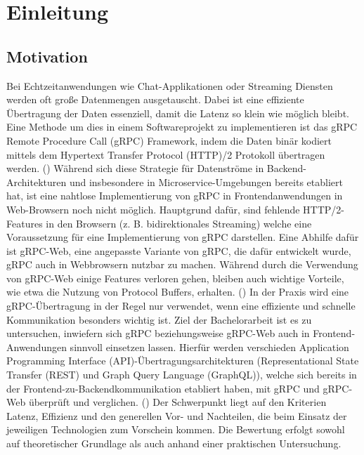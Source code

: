 \chapter{ Einleitung }
\label{chap:info_REMOVE_ME}
\chapterstart

\section{Motivation}
Bei Echtzeitanwendungen wie Chat-Applikationen oder Streaming Diensten werden oft große Datenmengen ausgetauscht. Dabei ist eine effiziente Übertragung der Daten essenziell, damit die Latenz so klein wie möglich bleibt. Eine Methode um dies in einem Softwareprojekt zu implementieren ist das gRPC Remote Procedure Call (gRPC) Framework, indem die Daten binär kodiert mittels dem Hypertext Transfer Protocol (HTTP)/2 Protokoll übertragen werden. (\parencite{gRPCAbout})
Während sich diese Strategie für Datenströme in Backend-Architekturen und insbesondere in Microservice-Umgebungen bereits etabliert hat, ist eine nahtlose Implementierung von gRPC in Frontendanwendungen in Web-Browsern noch nicht möglich. Hauptgrund dafür, sind fehlende HTTP/2-Features in den Browsern (z. B. bidirektionales Streaming) welche eine Voraussetzung für eine Implementierung von gRPC darstellen. Eine Abhilfe dafür ist gRPC-Web, eine angepasste Variante von gRPC, die dafür entwickelt wurde, gRPC auch in Webbrowsern nutzbar zu machen. Während durch die Verwendung von gRPC-Web einige Features verloren gehen, bleiben auch wichtige Vorteile, wie etwa die Nutzung von Protocol Buffers, erhalten. (\parencite{Brandhorst2019}) In der Praxis wird eine gRPC-Übertragung in der Regel nur verwendet, wenn eine effiziente und schnelle Kommunikation besonders wichtig ist. Ziel der Bachelorarbeit ist es zu untersuchen, inwiefern sich gRPC beziehungsweise gRPC-Web auch in Frontend-Anwendungen sinnvoll einsetzen lassen. Hierfür werden verschieden Application Programming Interface (API)-Übertragungsarchitekturen (Representational State Transfer (REST) und Graph Query Language (GraphQL)), welche sich bereits in der Frontend-zu-Backendkommunikation etabliert haben, mit gRPC und gRPC-Web überprüft und verglichen. (\parencite{redhat-apiguide}) Der Schwerpunkt liegt auf den Kriterien Latenz, Effizienz und den generellen Vor- und Nachteilen, die beim Einsatz der jeweiligen Technologien zum Vorschein kommen. Die Bewertung erfolgt sowohl auf theoretischer Grundlage als auch anhand einer praktischen Untersuchung.

